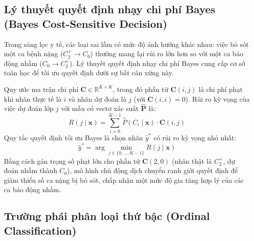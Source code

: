 \subsection{Lý thuyết quyết định nhạy chi phí Bayes (Bayes Cost-Sensitive Decision)}
\label{subsec:cost-sensitive-paradigm}

Trong sàng lọc y tế, các loại sai lầm có mức độ ảnh hưởng khác nhau: việc bỏ sót một ca bệnh nặng ($C_2^+ \to C_0$) thường mang lại rủi ro lớn hơn so với một ca báo động nhầm ($C_0 \to C_2^+$). Lý thuyết quyết định nhạy chi phí Bayes \cite{elkan2001foundations} cung cấp cơ sở toán học để tối ưu quyết định dưới sự bất cân xứng này.

Quy ước ma trận chi phí $\mathbf{C} \in \mathbb{R}^{K \times K}$, trong đó phần tử $\mathbf{C}(i, j)$ là chi phí phạt khi nhãn thực tế là $i$ và nhãn dự đoán là $j$ (với $\mathbf{C}(i, i) = 0$). Rủi ro kỳ vọng của việc dự đoán lớp $j$ với mẫu có vectơ xác suất $\hat{\mathbf{P}}$ là:
\begin{equation}
    R(j \mid \mathbf{x}) = \sum_{i=0}^{K-1} \hat{P}(C_i \mid \mathbf{x}) \cdot \mathbf{C}(i, j)
\end{equation}
Quy tắc quyết định tối ưu Bayes là chọn nhãn $\hat{y}^*$ có rủi ro kỳ vọng nhỏ nhất:
\begin{equation}
    \hat{y}^* = \arg\min_{j \in \{0, \dots, K-1\}} R(j \mid \mathbf{x})
\end{equation}
Bằng cách gán trọng số phạt lớn cho phần tử $\mathbf{C}(2, 0)$ (nhãn thật là $C_2^+$, dự đoán nhầm thành $C_0$), mô hình chủ động dịch chuyển ranh giới quyết định để giảm thiểu số ca nặng bị bỏ sót, chấp nhận một mức độ gia tăng hợp lý của các ca báo động nhầm.

\subsection{Trường phái phân loại thứ bậc (Ordinal Classification)}
\label{subsec:ordinal-paradigm}

